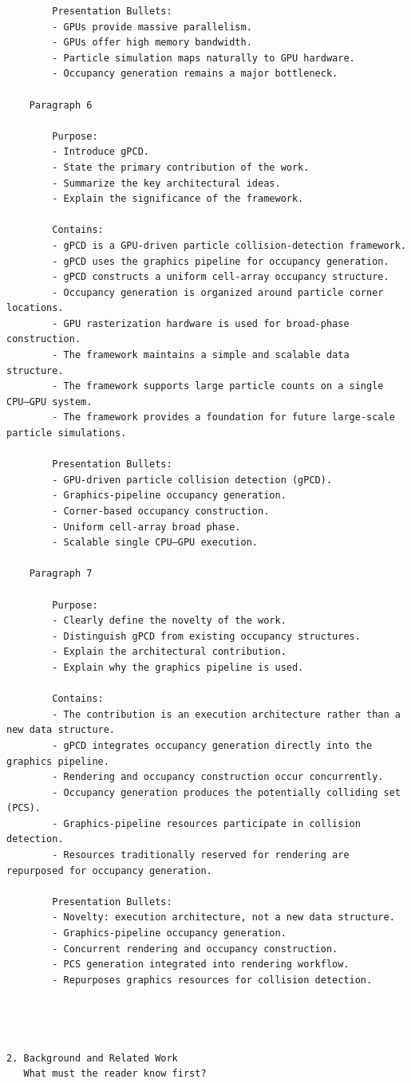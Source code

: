 \begin{verbatim}
		Presentation Bullets:
		- GPUs provide massive parallelism.
		- GPUs offer high memory bandwidth.
		- Particle simulation maps naturally to GPU hardware.
		- Occupancy generation remains a major bottleneck.  
   
	Paragraph 6

		Purpose:
		- Introduce gPCD.
		- State the primary contribution of the work.
		- Summarize the key architectural ideas.
		- Explain the significance of the framework.

		Contains:
		- gPCD is a GPU-driven particle collision-detection framework.
		- gPCD uses the graphics pipeline for occupancy generation.
		- gPCD constructs a uniform cell-array occupancy structure.
		- Occupancy generation is organized around particle corner locations.
		- GPU rasterization hardware is used for broad-phase construction.
		- The framework maintains a simple and scalable data structure.
		- The framework supports large particle counts on a single CPU–GPU system.
		- The framework provides a foundation for future large-scale particle simulations.

		Presentation Bullets:
		- GPU-driven particle collision detection (gPCD).
		- Graphics-pipeline occupancy generation.
		- Corner-based occupancy construction.
		- Uniform cell-array broad phase.
		- Scalable single CPU–GPU execution.
	
	Paragraph 7

		Purpose:
		- Clearly define the novelty of the work.
		- Distinguish gPCD from existing occupancy structures.
		- Explain the architectural contribution.
		- Explain why the graphics pipeline is used.

		Contains:
		- The contribution is an execution architecture rather than a new data structure.
		- gPCD integrates occupancy generation directly into the graphics pipeline.
		- Rendering and occupancy construction occur concurrently.
		- Occupancy generation produces the potentially colliding set (PCS).
		- Graphics-pipeline resources participate in collision detection.
		- Resources traditionally reserved for rendering are repurposed for occupancy generation.

		Presentation Bullets:
		- Novelty: execution architecture, not a new data structure.
		- Graphics-pipeline occupancy generation.
		- Concurrent rendering and occupancy construction.
		- PCS generation integrated into rendering workflow.
		- Repurposes graphics resources for collision detection.
	
	
	
	
2. Background and Related Work
   What must the reader know first?


\end{verbatim}

